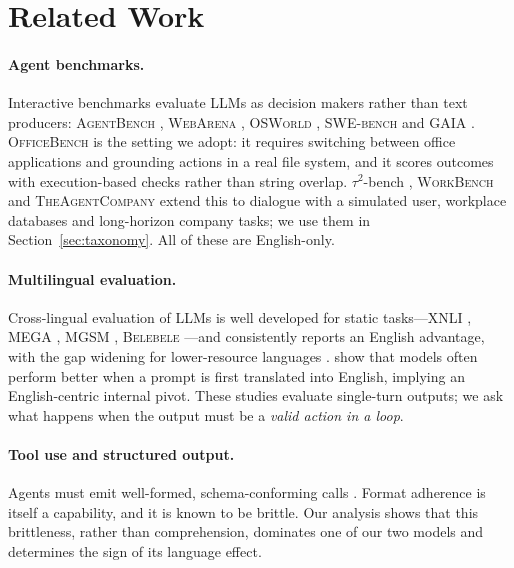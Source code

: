 \documentclass[11pt]{article}
\begin{document}
\section{Related Work}

\paragraph{Agent benchmarks.} Interactive benchmarks evaluate LLMs as decision makers rather
than text producers: \textsc{AgentBench} \citep{liu2023agentbench}, \textsc{WebArena}
\citep{zhou2024webarena}, \textsc{OSWorld} \citep{xie2024osworld}, \textsc{SWE-bench}
\citep{jimenez2024swebench} and \textsc{GAIA} \citep{mialon2024gaia}. \textsc{OfficeBench}
\citep{wang2024officebench} is the setting we adopt: it requires switching between office
applications and grounding actions in a real file system, and it scores outcomes with
execution-based checks rather than string overlap. $\tau^2$-bench \citep{barres2025tau2},
\textsc{WorkBench} \citep{styles2024workbench} and \textsc{TheAgentCompany}
\citep{xu2024theagentcompany} extend this to dialogue with a simulated user, workplace
databases and long-horizon company tasks; we use them in Section~\ref{sec:taxonomy}. All of
these are English-only.

\paragraph{Multilingual evaluation.} Cross-lingual evaluation of LLMs is well developed for
static tasks---\textsc{XNLI} \citep{conneau2018xnli}, \textsc{MEGA} \citep{ahuja2023mega},
\textsc{MGSM} \citep{shi2023mgsm}, \textsc{Belebele} \citep{bandarkar2024belebele}---and
consistently reports an English advantage, with the gap widening for lower-resource languages
\citep{huang2023notall,zhang2023dont}. \citet{etxaniz2024multilingual} show that models often
perform better when a prompt is first translated into English, implying an English-centric
internal pivot. These studies evaluate single-turn outputs; we ask what happens when the output
must be a \emph{valid action in a loop}.

\paragraph{Tool use and structured output.} Agents must emit well-formed, schema-conforming
calls \citep{schick2023toolformer,qin2024toolllm,patil2024gorilla}. Format adherence is itself a
capability, and it is known to be brittle. Our analysis shows that this brittleness, rather than
comprehension, dominates one of our two models and determines the sign of its language effect.
\end{document}
